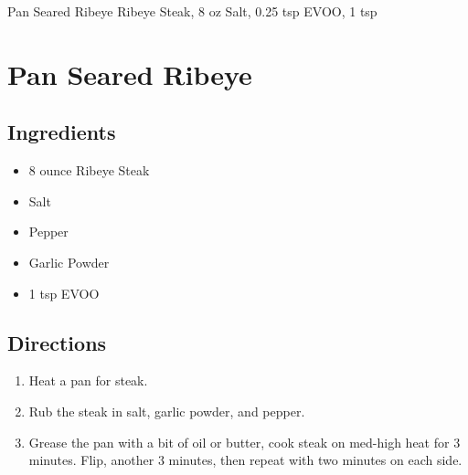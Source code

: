 Pan Seared Ribeye
  Ribeye Steak, 8 oz
  Salt, 0.25 tsp
  EVOO, 1 tsp

\section{ Pan Seared Ribeye }

\subsection{ Ingredients }

\begin{itemize}
  \item 8 ounce Ribeye Steak
  \item Salt
  \item Pepper
  \item Garlic Powder
  \item 1 tsp EVOO
\end{itemize}

\subsection{ Directions }

\begin{enumerate}
  \item Heat a pan for steak. 
  \item Rub the steak in salt, garlic powder, and pepper. 
  \item Grease the pan with a bit of oil or butter, cook steak on med-high heat for 3 minutes. Flip, another 3 minutes, then repeat with two minutes on each side. 
\end{enumerate}

